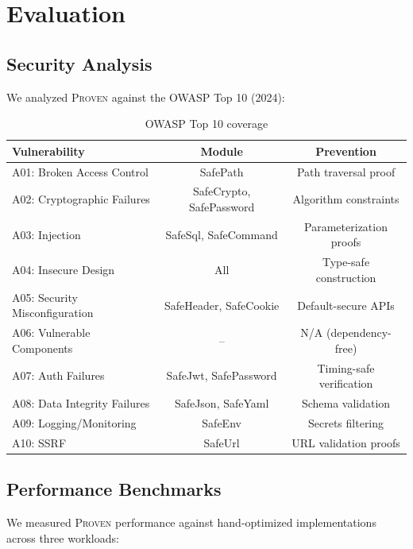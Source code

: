\documentclass[11pt,a4paper]{article}
\newcommand{\proven}{\textsc{Proven}}
\begin{document}
\section{Evaluation}

\subsection{Security Analysis}

We analyzed \proven{} against the OWASP Top 10 (2024):

\begin{table}[ht]
\centering
\begin{tabular}{lcc}
\toprule
\textbf{Vulnerability} & \textbf{Module} & \textbf{Prevention} \\
\midrule
A01: Broken Access Control & SafePath & Path traversal proof \\
A02: Cryptographic Failures & SafeCrypto, SafePassword & Algorithm constraints \\
A03: Injection & SafeSql, SafeCommand & Parameterization proofs \\
A04: Insecure Design & All & Type-safe construction \\
A05: Security Misconfiguration & SafeHeader, SafeCookie & Default-secure APIs \\
A06: Vulnerable Components & -- & N/A (dependency-free) \\
A07: Auth Failures & SafeJwt, SafePassword & Timing-safe verification \\
A08: Data Integrity Failures & SafeJson, SafeYaml & Schema validation \\
A09: Logging/Monitoring & SafeEnv & Secrets filtering \\
A10: SSRF & SafeUrl & URL validation proofs \\
\bottomrule
\end{tabular}
\caption{OWASP Top 10 coverage}
\label{tab:owasp}
\end{table}

\subsection{Performance Benchmarks}

We measured \proven{} performance against hand-optimized implementations across three workloads:
\end{document}
